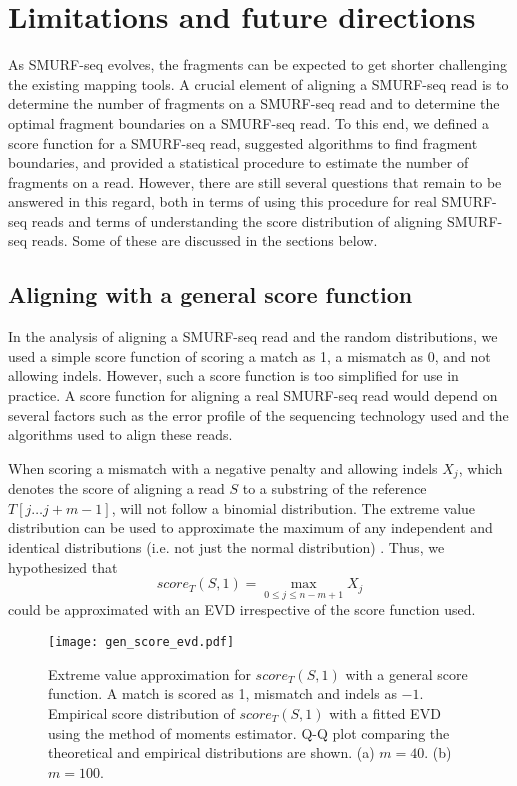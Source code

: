 \section{Limitations and future directions}
As SMURF-seq evolves, the fragments can be expected to get shorter
challenging the existing mapping tools. A crucial element of aligning
a SMURF-seq read is to determine the number of fragments on a SMURF-seq
read and to determine the optimal fragment boundaries on a SMURF-seq
read. To this end, we defined a score function for a SMURF-seq read,
suggested algorithms to find fragment boundaries, and provided a
statistical procedure to estimate the number of fragments on a read.
%
However, there are still several questions that remain to be answered in
this regard, both in terms of using this procedure for real SMURF-seq
reads and terms of understanding the score distribution of aligning
SMURF-seq reads. Some of these are discussed in the sections below.


\subsection*{Aligning with a general score function}
In the analysis of aligning a SMURF-seq read and the random
distributions, we used a simple score function of scoring a match as 1, a
mismatch as 0, and not allowing indels. However, such a score function
is too simplified for use in practice. A score function for aligning a
real SMURF-seq read would depend on several factors such as
the error profile of the sequencing technology used and the algorithms
used to align these reads.

When scoring a mismatch with a negative penalty and allowing indels
$X_j$, which denotes the score of aligning a read $S$ to a substring of the
reference $T[j \dots j+m-1]$, will not follow a binomial distribution.
%
The extreme value distribution can be used to approximate the maximum of
any independent and identical distributions (i.e. not just the normal
distribution) \citep{kotz2000extreme}.  Thus, we hypothesized that
\[score_T(S,1) = \max_{0 \leq j \leq n-m+1} X_j\]  could be approximated
with an EVD irrespective of the score function used.

\begin{figure}[t!]
\centering
\texttt{[image: gen\_score\_evd.pdf]}
\caption[Extreme value approximation for $score_T(S,1)$ with a general
  score function]{
  Extreme value approximation for $score_T(S,1)$ with a general score
  function. A match is scored as 1, mismatch and indels as $-1$.
  Empirical score distribution of $score_T(S,1)$ with a fitted
  EVD using the method of moments estimator.
  Q-Q plot comparing the theoretical and empirical distributions are shown.
  (a) $m=40$.
  (b) $m=100$.}
\label{gen_score_evd}
\end{figure}

